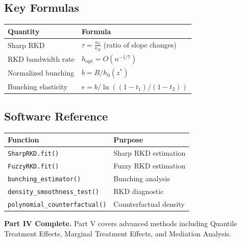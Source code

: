 \begin{center}
\end{center}

\subsection{Key Formulas}

\begin{center}
\begin{tabular}{ll}
\toprule
\textbf{Quantity} & \textbf{Formula} \\
\midrule
Sharp RKD & $\tau = \frac{\kappa_Y}{\kappa_B}$ (ratio of slope changes) \\
RKD bandwidth rate & $h_{\text{opt}} = O(n^{-1/7})$ \\
Normalized bunching & $b = B / h_0(z^*)$ \\
Bunching elasticity & $e = b / \ln((1-t_1)/(1-t_2))$ \\
\bottomrule
\end{tabular}
\end{center}

\subsection{Software Reference}

\begin{center}
\begin{tabular}{ll}
\toprule
\textbf{Function} & \textbf{Purpose} \\
\midrule
\texttt{SharpRKD.fit()} & Sharp RKD estimation \\
\texttt{FuzzyRKD.fit()} & Fuzzy RKD estimation \\
\texttt{bunching\_estimator()} & Bunching analysis \\
\texttt{density\_smoothness\_test()} & RKD diagnostic \\
\texttt{polynomial\_counterfactual()} & Counterfactual density \\
\bottomrule
\end{tabular}
\end{center}

\vspace{1em}
\noindent\textbf{Part IV Complete.} Part V covers advanced methods including Quantile Treatment Effects, Marginal Treatment Effects, and Mediation Analysis.
